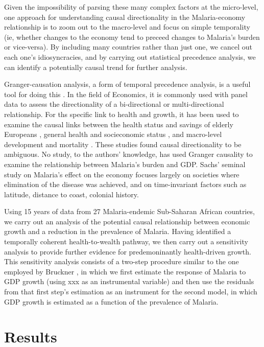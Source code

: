 \documentclass[9pt,twocolumn,twoside,lineno]{pnas-new}
\begin{document}
Given the impossibility of parsing these many complex factors at the micro-level, one approach for understanding causal directionality in the Malaria-economy relationship is to zoom out to the macro-level and focus on simple temporality (ie, whether changes to the economy tend to preceed changes to Malaria’s burden or vice-versa). By including many countries rather than just one, we cancel out each one’s idiosyncracies, and by carrying out statistical precedence analysis, we can identify a potentially causal trend for further analysis. 

Granger-causation analysis, a form of temporal precedence analysis, is a useful tool for doing this \cite{Granger_undated-wn, Molenaar2018-ss, Koller2016-rv, Granger1896-di, Clarke_JA2016-ik}. In the field of Economics, it is commonly used with panel data to assess the directionality of a bi-directional \cite{Law_2013, Joerding1986, ADALI_2017} or multi-directional \cite{Akbas_2013} relationship. For ths specific link to health and growth, it has been used to examine the causal links between the health status and savings of elderly Europeans \cite{Andreyeva2007-zq}, general health and socieconomic status \cite{Adams2003-wl}, and macro-level development and mortality \cite{Clarke_JA2016-ik}. These studies found causal directionality to be ambiguous. No study, to the authors’ knowledge, has used Granger causality to examine the relationship between Malaria’s burden and GDP. Sachs' seminal study on Malaria's effect on the economy \cite{Sachs2002-ig} focuses largely on societies where elimination of the disease was achieved, and on time-invariant factors such as latitude, distance to coast, colonial history.

Using 15 years of data from 27 Malaria-endemic Sub-Saharan African countries, we carry out an analysis of the potential causal relationship between economic growth and a reduction in the prevalence of Malaria. Having identified a temporally coherent health-to-wealth pathway, we then carry out a sensitivity analysis to provide further evidence for predemoninantly health-driven growth. This sensitivity analysis consists of a two-step procedure similar to the one employed by Bruckner \cite{bruckner2011}, in which we first estimate the response of Malaria to GDP growth (using xxx as an instrumental variable) and then use the residuals from that first step's estimation as an instrument for the second model, in which GDP growth is estimated as a function of the prevalence of Malaria. 

\section*{Results}
\end{document}
